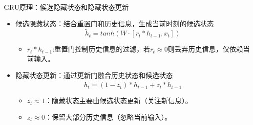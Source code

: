 \begin{frame}{GRU原理：候选隐藏状态和隐藏状态更新}
    \begin{itemize}
        \item 候选隐藏状态：结合重置门和历史信息，生成当前时刻的候选状态
        \begin{equation*}
            \tilde{h}_t = tanh(W \cdot [r_t * h_{t-1},x_t])
        \end{equation*}
        \begin{itemize}
            \item \(r_t * h_{t-1}\):重置门控制历史信息的过滤，若\(r_t \approx 0\)则丢弃历史信息，仅依赖当前输入。
        \end{itemize}
        \item 隐藏状态更新：通过更新门融合历史状态和候选状态
        \begin{equation*}
            h_t = (1-z_t) * h_{t-1} + z_t * \tilde{h}_{t-1}
        \end{equation*}
        \begin{itemize}
            \item \(z_t \approx 1\)：隐藏状态主要由候选状态更新（关注新信息）。
            \item \(z_t \approx 0\)：保留大部分历史信息（忽略当前输入）。
        \end{itemize}
    \end{itemize}
\end{frame}




